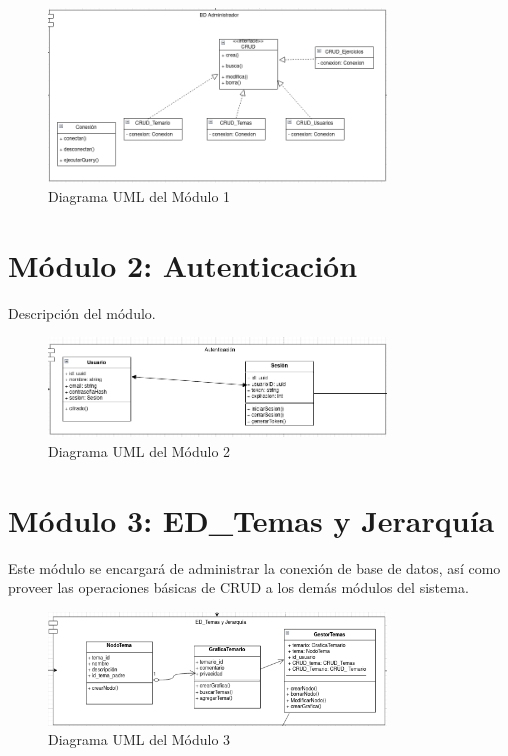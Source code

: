 \documentclass{report}
\begin{document}
\begin{figure}[H]
    \centering
    \includegraphics[width=0.8\textwidth]{./Diagramas/Modulo1.png}
    \caption{Diagrama UML del Módulo 1}
\end{figure}

\section{Módulo 2: Autenticación}
Descripción del módulo.

\begin{figure}[H]
    \centering
    \includegraphics[width=0.8\textwidth]{./Diagramas/Modulo2.png}
    \caption{Diagrama UML del Módulo 2}
\end{figure}

\section{Módulo 3: ED\_Temas y Jerarquía}
Este módulo se encargará de administrar la conexión de base de datos, así como proveer las operaciones básicas de CRUD a los demás módulos del sistema.

\begin{figure}[H]
    \centering
    \includegraphics[width=0.8\textwidth]{./Diagramas/Modulo3.png}
    \caption{Diagrama UML del Módulo 3}
\end{figure}
\end{document}
